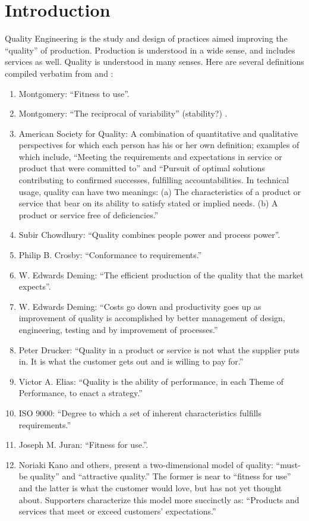 
\chapter{Introduction}

Quality Engineering is the study and design of practices aimed improving the ``quality'' of production. 
Production is understood in a wide sense, and includes services as well.
Quality is understood in many senses. Here are several definitions compiled verbatim from \cite{montgomery_introduction_2007}  and \cite{wikipedia_quality_2015}:
\begin{enumerate}
\item Montgomery: ``Fitness to use''.
\item Montgomery: ``The reciprocal of variability'' (stability?) .
\item American Society for Quality:
A combination of quantitative and qualitative perspectives for which each person has his or her own definition; examples of which include, ``Meeting the requirements and expectations in service or product that were committed to'' and ``Pursuit of optimal solutions contributing to confirmed successes, fulfilling accountabilities.
 In technical usage, quality can have two meanings: 
 (a) The characteristics of a product or service that bear on its ability to satisfy stated or implied needs. 
 (b) A product or service free of deficiencies.''
\item Subir Chowdhury: 
``Quality combines people power and process power''.
\item Philip B. Crosby: 
``Conformance to requirements.''
\item  W. Edwards Deming:
``The efficient production of the quality that the market expects''.
\item W. Edwards Deming: 
``Costs go down and productivity goes up as improvement of quality is accomplished by better management of design, engineering, testing and by improvement of processes.''
\item Peter Drucker: 
``Quality in a product or service is not what the supplier puts in. It is what the customer gets out and is willing to pay for.''
\item Victor A. Elias: 
``Quality is the ability of performance, in each Theme of Performance, to enact a strategy.''
\item ISO 9000: 
``Degree to which a set of inherent characteristics fulfills requirements.'' 
\item Joseph M. Juran: 
``Fitness for use.''. 
\item Noriaki Kano and others, present a two-dimensional model of quality: ``must-be quality'' and ``attractive quality.'' The former is near to ``fitness for use'' and the latter is what the customer would love, but has not yet thought about. Supporters characterize this model more succinctly as: ``Products and services that meet or exceed customers' expectations.''

\end{enumerate}
